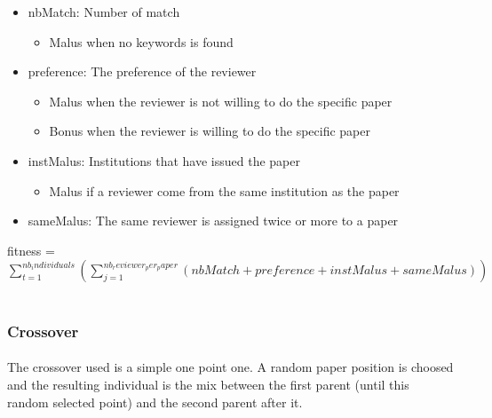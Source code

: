 \documentclass{article}
\begin{document}
        \begin{itemize}
          \item nbMatch: Number of match 
          \begin{itemize}
            \item Malus when no keywords is found
          \end{itemize}
          \item preference: The preference of the reviewer
          \begin{itemize}
            \item Malus when the reviewer is not willing to do the specific paper
            \item Bonus when the reviewer is willing to do the specific paper
          \end{itemize}

          \item instMalus: Institutions that have issued the paper
          \begin{itemize}
            \item Malus if a reviewer come from the same institution as the paper
          \end{itemize}
          \item sameMalus: The same reviewer is assigned twice or more to a paper 
        \end{itemize}

        
        fitness = $\sum_{t=1}^{nb_individuals} (\sum_{j=1}^{nb_reviewer_per_paper}( nbMatch +
        preference + instMalus + sameMalus)) $
        \\
        \\

    
    \subsubsection{Crossover} %
    \label{ssub:Crossover}
      
      \paragraph{} %
      \label{par:}
      The crossover used is a simple one point one. A random paper position is
      choosed and the resulting individual is the mix between the first parent
      (until this random selected point) and the second parent after it.
      
\end{document}
